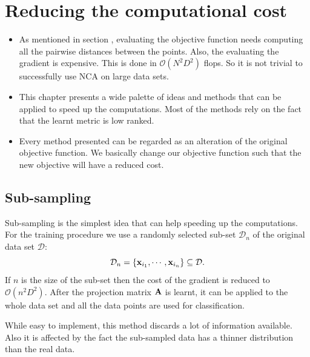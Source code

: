 \chapter{Reducing the computational cost}
\label{ch:reducing}

\begin{itemize}
	\item As mentioned in section , evaluating the objective function needs
computing all the pairwise distances between the points. Also, the evaluating
the gradient is expensive. This is done in $\mathcal{O}(N^2D^2)$ flops. So it is
not trivial to successfully use NCA on large data sets.
	\item This chapter presents a wide palette of ideas and methods that can be
applied to speed up the computations. Most of the methods rely on the fact that
the learnt metric is low ranked.
	\item Every method presented can be regarded as an alteration of the original
objective function. We basically change our objective function such that the new
objective will have a reduced cost.
\end{itemize}

\section{Sub-sampling}
\label{sec:sub-sampling}

Sub-sampling is the simplest idea that can help speeding up the computations.
For the training procedure we use a randomly selected sub-set $\mathcal{D}_n$ of
the original data set $\mathcal{D}$:
 \[
 	\mathcal{D}_n = \{ \mathbf{x}_{i_1},\cdots,\mathbf{x}_{i_n} \} \subseteq \mathcal{D}.
 \]
 If $n$ is the size of the sub-set then the cost of the gradient is reduced to
$\mathcal{O}(n^2D^2)$. After the projection matrix $\mathbf{A}$ is learnt, it can be
applied to the whole data set and all the data points are used for
classification.

While easy to implement, this method discards a lot of information available.
Also it is affected by the fact the sub-sampled data has a thinner distribution
than the real data. 

